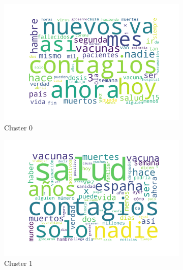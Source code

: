 \begin{figure}
    \centering
    \begin{subfigure}[b]{0.49\textwidth}
        \centering
        \includegraphics[width=\textwidth]{results/TopicDetection/es/cluster0.png}
        \caption{Cluster 0}
        \label{fig:es_c0}
    \end{subfigure}
    \hfill
    \begin{subfigure}[b]{0.49\textwidth}
        \centering
        \includegraphics[width=\textwidth]{results/TopicDetection/es/cluster1.png}
        \caption{Cluster 1}
        \label{fig:es_c1}
    \end{subfigure}
    \hfill
    \begin{subfigure}[b]{0.49\textwidth}
        \centering

\end{subfigure}
\end{figure}
